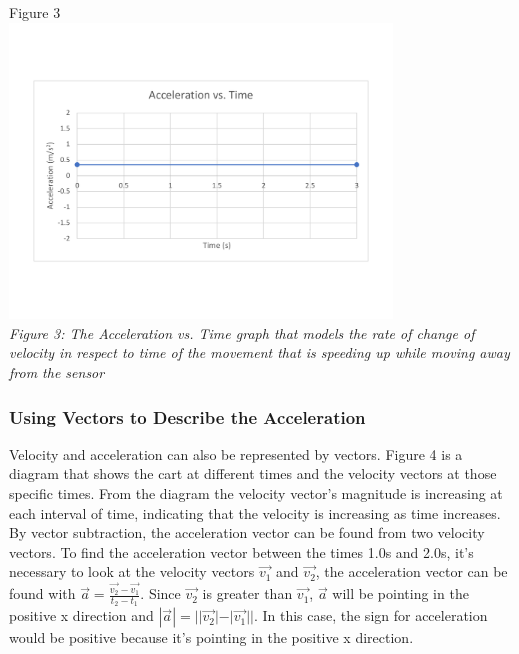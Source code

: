 \documentclass[aps,letterpaper,11pt]{revtex4}
\begin{document}
\begin{center}
Figure 3\\
\vspace{-10mm}
\includegraphics[width=4in]{PartAAccvsTime.pdf}\\
\vspace{-10mm}
\textit{Figure 3: The Acceleration vs. Time graph that models the rate of change of velocity in respect to time of the movement that is speeding up while moving away from the sensor}
\end{center}

\subsubsection{Using Vectors to Describe the Acceleration}

Velocity and acceleration can also be represented by vectors. Figure 4 is a diagram that shows the cart at different times and the velocity vectors at those specific times. From the diagram the velocity vector's magnitude is increasing at each interval of time, indicating that the velocity is increasing as time increases. By vector subtraction, the acceleration vector can be found from two velocity vectors. To find the acceleration vector between the times 1.0s and 2.0s, it's necessary to look at the velocity vectors $\vec{v_1}$ and $\vec{v_2}$, the acceleration vector can be found with $\vec{a} = \frac{\vec{v_2} - \vec{v_1}}{t_2 - t_1}$. Since $\vec{v_2}$ is greater than $\vec{v_1}$, $\vec{a}$ will be pointing in the positive x direction and $|\vec{a}| = ||\vec{v_2}| - |\vec{v_1}||$. In this case, the sign for acceleration would be positive because it's pointing in the positive x direction.  

\newpage
 
\end{document}
